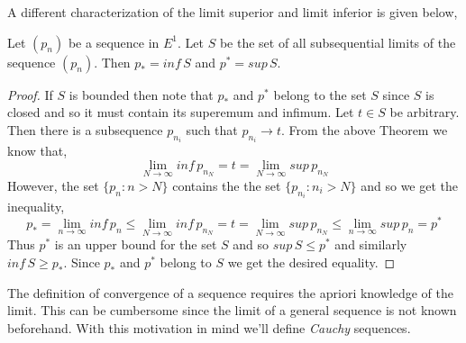 A different characterization of the limit superior and limit inferior is given below,
\begin{Theorem}
    Let $(p_n)$ be a sequence in $E^1$. Let $S$ be the set of all subsequential limits of the
    sequence $(p_n)$. Then $p_{*} = inf\, S$ and $p^{*} = sup \, S$.
\end{Theorem}
\begin{proof}
    If $S$ is bounded then note that $p_{*}$ and $p^{*}$ belong to the set $S$ since $S$ is closed 
    and so it must contain its superemum and infimum. Let $t \in S$ be arbitrary. Then there is a 
    subsequence $p_{n_i}$ such that $p_{n_i} \to t$. From the above Theorem we know that,
    \begin{equation*}
	\lim_{N \to \infty} inf \, p_{n_N} = t = \lim_{N \to \infty} sup \, p_{n_N}
    \end{equation*}
    However, the set $\lbrace p_n : n > N \rbrace$ contains the the set $\lbrace p_{n_i} : n_i > N
    \rbrace$ and so we get the inequality,
    \begin{equation*}
	p_{*} = \lim_{n \to \infty} inf \, p_{n} \leq \lim_{N \to \infty} inf \, p_{n_N} = t = \lim_{N \to
	    \infty} sup \, p_{n_N} \leq \lim_{n \to \infty} sup \, p_{n} = p^{*}
    \end{equation*}
    Thus $p^{*}$ is an upper bound for the set $S$ and so $sup \, S \leq p^{*} $ 
    and similarly $inf \, S \geq p_{*}$. Since $p_{*}$ and $p^{*}$ belong to $S$ we get the desired
    equality.
\end{proof}

The definition of convergence of a sequence requires the apriori knowledge of the limit. This can be
cumbersome since the limit of a general sequence is not known beforehand. With this motivation in
mind we'll define \emph{Cauchy} sequences.

